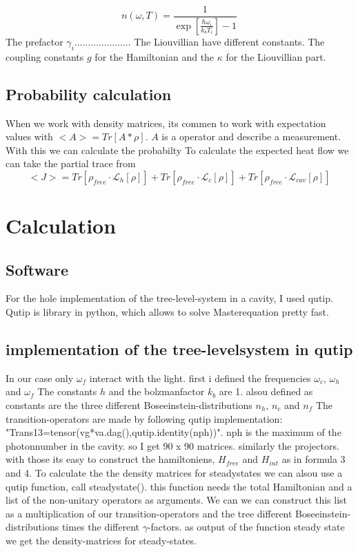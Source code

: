 \documentclass[12pt,a4paper]{article}
\begin{document}
\begin{equation}
n(\omega,T)=\frac{1}{\exp[\frac{\hbar \omega_i}{k_b T_i}]-1}
\end{equation}
The  prefactor $\gamma_i$.....................
The Liouvillian have different constants. The coupling constants $g$ for the Hamiltonian and the $\kappa$ for the Liouvillian part. 





\subsection{Probability calculation}
 When we work with density matrices, its commen to work with expectation values with $<A>=Tr[A*\rho]$.
 $A$ is a operator and describe a measurement.
With this we can calculate the probabilty 
To calculate the expected heat flow we can take the partial trace from 
\begin{equation}
<J>=Tr[\rho_{free}\cdot \mathcal{L}_h[\rho]]+Tr[\rho_{free}\cdot \mathcal{L}_c[\rho]]+Tr[\rho_{free}\cdot \mathcal{L}_{cav}[\rho]]
\end{equation}


\section{Calculation}
\subsection{Software}
For the hole implementation of the tree-level-system in a cavity, I used qutip. Qutip is library in python, which allows to solve Masterequation pretty fast.
\subsection{implementation of the tree-levelsystem in qutip}
In our case only $\omega_f$ interact with the light. 
first i defined the frequencies $ \omega_c $, $ \omega_h$ and $ \omega_f$ 
The constants $h $ and the bolzmanfactor $k_b$ are 1.
alsou defined as constants are the three different Boseeinstein-distributions $n_h$, $n_c$ and $n_f$
The transition-operators are  made by following qutip implementation: "Trans13=tensor(vg*va.dag(),qutip.identity(nph))". nph is the maximum of the photonnumber in the cavity. so I get 90 x 90 matrices. 
similarly the projectors. 
with those its easy to construct the hamiltoniens, $H_{free}$ and $H_{int}$ as in formula 3 and 4.
To calculate the the density matrices for steadystates we can alsou use a qutip function, call steadystate().
this function needs the total Hamiltonian and a list of the non-unitary operators as arguments.
We can we can construct this list as a multiplication of our transition-operators and the tree different Boseeinstein-distributions times the different $\gamma$-factors. 
as output of the function steady state we get the density-matrices for steady-states.
\end{document}
